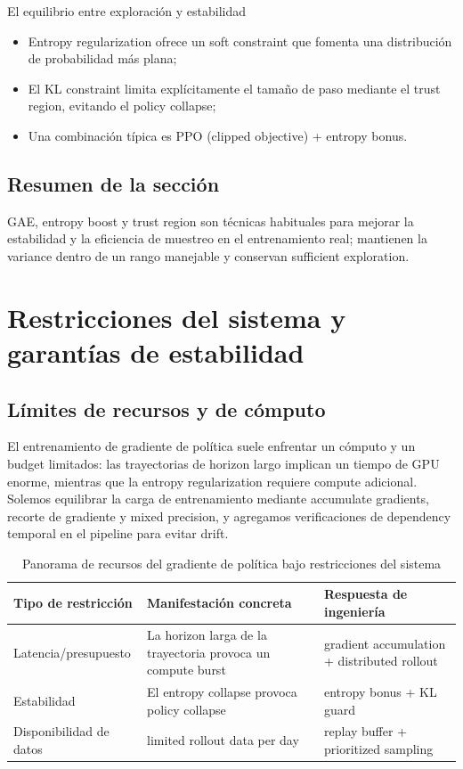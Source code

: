 \documentclass[a4paper]{article}
\begin{document}
\begin{knowledgebox}{El equilibrio entre exploración y estabilidad}
\begin{itemize}
    \item Entropy regularization ofrece un soft constraint que fomenta una distribución de probabilidad más plana;
    \item El KL constraint limita explícitamente el tamaño de paso mediante el trust region, evitando el policy collapse;
    \item Una combinación típica es PPO (clipped objective) + entropy bonus.
\end{itemize}
\end{knowledgebox}

\subsection{Resumen de la sección}
GAE, entropy boost y trust region son técnicas habituales para mejorar la estabilidad y la eficiencia de muestreo en el entrenamiento real; mantienen la variance dentro de un rango manejable y conservan sufficient exploration.

\section{Restricciones del sistema y garantías de estabilidad}
\subsection{Límites de recursos y de cómputo}
El entrenamiento de gradiente de política suele enfrentar un cómputo y un budget limitados: las trayectorias de horizon largo implican un tiempo de GPU enorme, mientras que la entropy regularization requiere compute adicional. Solemos equilibrar la carga de entrenamiento mediante accumulate gradients, recorte de gradiente y mixed precision, y agregamos verificaciones de dependency temporal en el pipeline para evitar drift.

\begin{table}[H]
\centering
\small
\begin{tabular}{p{}p{}p{}}
\toprule
Tipo de restricción & Manifestación concreta & Respuesta de ingeniería \\
\midrule
Latencia/presupuesto & La horizon larga de la trayectoria provoca un compute burst & gradient accumulation + distributed rollout \\
Estabilidad & El entropy collapse provoca policy collapse & entropy bonus + KL guard \\
Disponibilidad de datos & limited rollout data per day & replay buffer + prioritized sampling \\
\bottomrule
\end{tabular}
\caption{Panorama de recursos del gradiente de política bajo restricciones del sistema}
\end{table}
\end{document}

